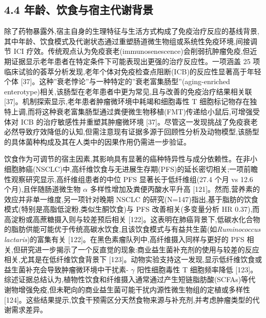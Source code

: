 \documentclass[11pt]{article}
\begin{document}
\subsection{4.4 年龄、饮食与宿主代谢背景}\label{ux5e74ux9f84ux996eux98dfux4e0eux5bbfux4e3bux4ee3ux8c22ux80ccux666f}

除了药物暴露外,宿主自身的生理特征与生活方式构成了免疫治疗反应的基线背景,其中年龄、饮食模式及代谢状态通过重塑肠道微生物组或系统性免疫环境,间接调节 ICI 疗效。传统观点认为免疫衰老(immunosenescence)会削弱抗肿瘤免疫,但近期证据显示老年患者在特定条件下可能表现出更强的治疗反应性。一项涵盖 25 项临床试验的荟萃分析发现,老年个体对免疫检查点阻断(ICB)的反应性显著高于年轻个体 {[}37{]}。这种''衰老悖论''与一种特定的''衰老富集肠型''(aging-enriched enterotype)相关,该肠型在老年患者中更为常见,且与改善的免疫治疗结果相关联 {[}37{]}。机制探索显示,老年患者肿瘤微环境中耗竭和细胞毒性 T 细胞标记物存在独特上调,而将这种衰老富集肠型通过粪便微生物移植(FMT)传递给小鼠后,可增强受体对 ICB 的治疗敏感性并重塑其肿瘤微环境 {[}37{]}。尽管这一发现挑战了免疫衰老必然导致疗效降低的认知,但需注意现有证据多源于回顾性分析及动物模型,该肠型的具体菌种构成及其在人类中的因果作用仍需进一步验证。

饮食作为可调节的宿主因素,其影响具有显著的癌种特异性与成分依赖性。在非小细胞肺癌(NSCLC)中,高纤维饮食与无进展生存期(PFS)的延长密切相关;一项前瞻性观察研究显示,高纤维组患者的中位 PFS 显著长于低纤维组(27.4 个月 vs 12.6 个月),且伴随肠道微生物 \(\alpha\) 多样性增加及粪便丙酸水平升高 {[}121{]}。然而,营养素的效应并非单一维度,另一项针对晚期 NSCLC 的研究(N=147)指出,基于脂肪的饮食模式(特别是高脂低淀粉,类似生酮饮食)与 PFS 改善相关(多变量分析 HR 0.37),而高淀粉或高蔗糖摄入则与较差预后相关 {[}122{]}。这表明在肺癌背景下,低碳水化合物的脂肪供能可能优于传统高碳水饮食,且该饮食模式与有益共生菌(如\emph{Ruminococcus lactaris})的富集有关 {[}122{]}。在黑色素瘤队列中,高纤维摄入同样与更好的 PFS 相关,但研究进一步揭示了一个反直觉的现象:商业益生菌补充剂的使用与较差的反应相关,尤其是在低纤维饮食背景下 {[}123{]}。动物实验支持这一发现,显示低纤维饮食或益生菌补充会导致肿瘤微环境中干扰素- \(\gamma\) 阳性细胞毒性 T 细胞频率降低 {[}123{]}。综述证据总结认为,植物性饮食和纤维摄入通常通过产生短链脂肪酸(SCFAs)等代谢物增强免疫,但未靶向的商业益生菌可能干扰内源性微生物组的定植或多样性 {[}124{]}。这些结果提示,饮食干预需区分天然食物来源与补充剂,并考虑肿瘤类型的代谢需求差异。
\end{document}
